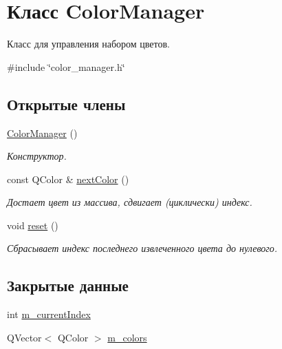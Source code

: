 \hypertarget{class_color_manager}{}\section{Класс Color\+Manager}
\label{class_color_manager}


Класс для управления набором цветов.  




{\ttfamily \#include \char`\"{}color\+\_\+manager.\+h\char`\"{}}

\subsection*{Открытые члены}
\begin{DoxyCompactItemize}
\item 
\hyperlink{class_color_manager_a430efaaefd3650e29bcf4802394c29e9}{Color\+Manager} ()
\begin{DoxyCompactList}\small\item\em Конструктор. \end{DoxyCompactList}\item 
const Q\+Color \& \hyperlink{class_color_manager_ab7ace598efd321831f0924572a4bf84e}{next\+Color} ()\hypertarget{class_color_manager_ab7ace598efd321831f0924572a4bf84e}{}\label{class_color_manager_ab7ace598efd321831f0924572a4bf84e}

\begin{DoxyCompactList}\small\item\em Достает цвет из массива, сдвигает (циклически) индекс. \end{DoxyCompactList}\item 
void \hyperlink{class_color_manager_ae32d588a9d0144e2d55408c29f2f11ef}{reset} ()\hypertarget{class_color_manager_ae32d588a9d0144e2d55408c29f2f11ef}{}\label{class_color_manager_ae32d588a9d0144e2d55408c29f2f11ef}

\begin{DoxyCompactList}\small\item\em Сбрасывает индекс последнего извлеченного цвета до нулевого. \end{DoxyCompactList}\end{DoxyCompactItemize}
\subsection*{Закрытые данные}
\begin{DoxyCompactItemize}
\item 
int \hyperlink{class_color_manager_a7b6e45b4281881b4cf37a40dafd1a77a}{m\+\_\+current\+Index}
\item 
Q\+Vector$<$ Q\+Color $>$ \hyperlink{class_color_manager_ac91ea962bfa95bc3ed7da0bfd44615f4}{m\+\_\+colors}
\end{DoxyCompactItemize}


